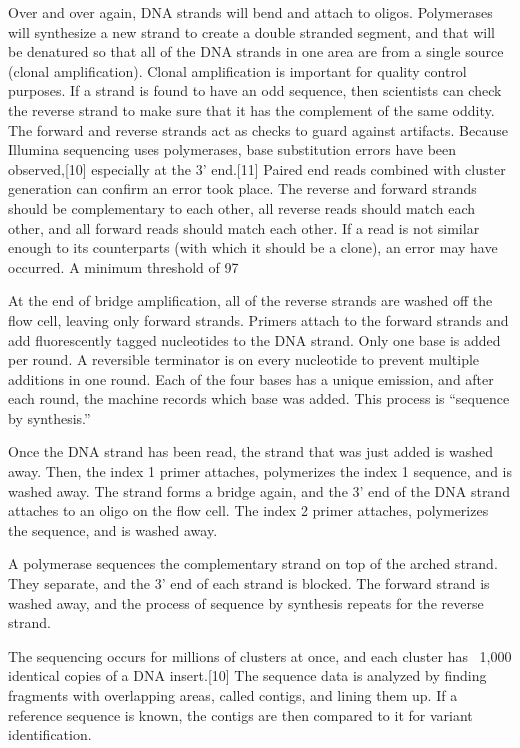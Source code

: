 Over and over again, DNA strands will bend and attach to oligos. Polymerases will synthesize a new strand to create a double stranded segment, and that will be denatured so that all of the DNA strands in one area are from a single source (clonal amplification). Clonal amplification is important for quality control purposes. If a strand is found to have an odd sequence, then scientists can check the reverse strand to make sure that it has the complement of the same oddity. The forward and reverse strands act as checks to guard against artifacts. Because Illumina sequencing uses polymerases, base substitution errors have been observed,[10] especially at the 3’ end.[11] Paired end reads combined with cluster generation can confirm an error took place. The reverse and forward strands should be complementary to each other, all reverse reads should match each other, and all forward reads should match each other. If a read is not similar enough to its counterparts (with which it should be a clone), an error may have occurred. A minimum threshold of 97%

At the end of bridge amplification, all of the reverse strands are washed off the flow cell, leaving only forward strands. Primers attach to the forward strands and add fluorescently tagged nucleotides to the DNA strand. Only one base is added per round. A reversible terminator is on every nucleotide to prevent multiple additions in one round. Each of the four bases has a unique emission, and after each round, the machine records which base was added. This process is “sequence by synthesis.”

Once the DNA strand has been read, the strand that was just added is washed away. Then, the index 1 primer attaches, polymerizes the index 1 sequence, and is washed away. The strand forms a bridge again, and the 3’ end of the DNA strand attaches to an oligo on the flow cell. The index 2 primer attaches, polymerizes the sequence, and is washed away.

A polymerase sequences the complementary strand on top of the arched strand. They separate, and the 3’ end of each strand is blocked. The forward strand is washed away, and the process of sequence by synthesis repeats for the reverse strand.

The sequencing occurs for millions of clusters at once, and each cluster has ~1,000 identical copies of a DNA insert.[10] The sequence data is analyzed by finding fragments with overlapping areas, called contigs, and lining them up. If a reference sequence is known, the contigs are then compared to it for variant identification.

